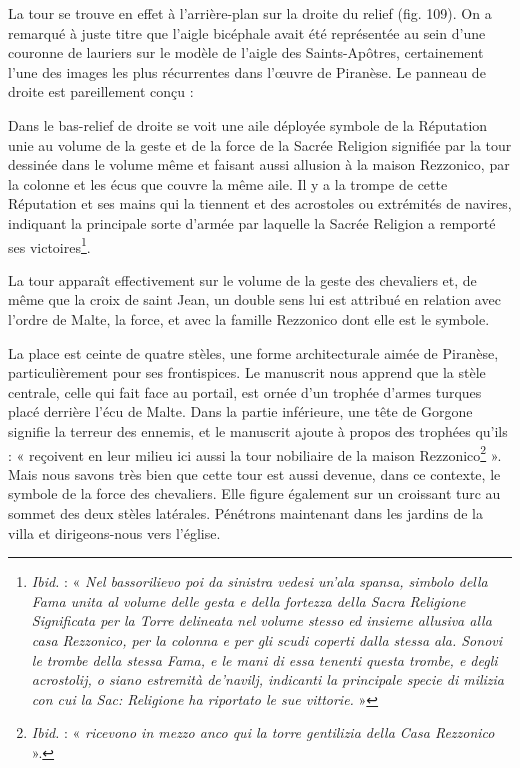 \documentclass[12pt,twoside,openany]{book}
\renewenvironment{quote}
  {%
    \par\begingroup
    \fontsize{11pt}{14pt}\selectfont
    \list{}{\leftmargin=1.5em\rightmargin=1.5em}%
    \item\relax
  }
  {%
    \endlist
    \endgroup
  }
\newenvironment{PurhBlockQuote}
  {%
    \begin{quote}
  }
  {%
    \end{quote}
  }
\begin{document}
La tour se trouve en effet à l’arrière-plan sur la droite du relief (fig. 109). On a remarqué à juste titre que l’aigle bicéphale avait été représentée au sein d’une couronne de lauriers sur le modèle de l’aigle des Saints-Apôtres, certainement l’une des images les plus récurrentes dans l’œuvre de Piranèse. Le panneau de droite est pareillement conçu :

\begin{PurhBlockQuote}
Dans le bas-relief de droite se voit une aile déployée symbole de la Réputation unie au volume de la geste et de la force de la Sacrée Religion signifiée par la tour dessinée dans le volume même et faisant aussi allusion à la maison Rezzonico, par la colonne et les écus que couvre la même aile. Il y a la trompe de cette Réputation et ses mains qui la tiennent et des acrostoles ou extrémités de navires, indiquant la principale sorte d’armée par laquelle la Sacrée Religion a remporté ses victoires\footnote{\textit{Ibid. }: « \textit{Nel bassorilievo poi da sinistra vedesi un’ala spansa, simbolo della Fama unita al volume delle gesta e della fortezza della Sacra Religione Significata per la Torre delineata nel volume stesso ed insieme allusiva alla casa Rezzonico, per la colonna e per gli scudi coperti dalla stessa ala. Sonovi le trombe della stessa Fama, e le mani di essa tenenti questa trombe, e degli acrostolij, o siano estremità de’navilj, indicanti la principale specie di milizia con cui la Sac: Religione ha riportato le sue vittorie.} »}.
\end{PurhBlockQuote}

La tour apparaît effectivement sur le volume de la geste des chevaliers et, de même que la croix de saint Jean, un double sens lui est attribué en relation avec l’ordre de Malte, la force, et avec la famille Rezzonico dont elle est le symbole.

La place est ceinte de quatre stèles, une forme architecturale aimée de Piranèse, particulièrement pour ses frontispices. Le manuscrit nous apprend que la stèle centrale, celle qui fait face au portail, est ornée d’un trophée d’armes turques placé derrière l’écu de Malte. Dans la partie inférieure, une tête de Gorgone signifie la terreur des ennemis, et le manuscrit ajoute à propos des trophées qu’ils : « reçoivent en leur milieu ici aussi la tour nobiliaire de la maison Rezzonico\footnote{\textit{Ibid. }: « \textit{ricevono in mezzo anco qui la torre gentilizia della Casa Rezzonico} ».} ». Mais nous savons très bien que cette tour est aussi devenue, dans ce contexte, le symbole de la force des chevaliers. Elle figure également sur un croissant turc au sommet des deux stèles latérales. Pénétrons maintenant dans les jardins de la villa et dirigeons-nous vers l’église.
\end{document}
